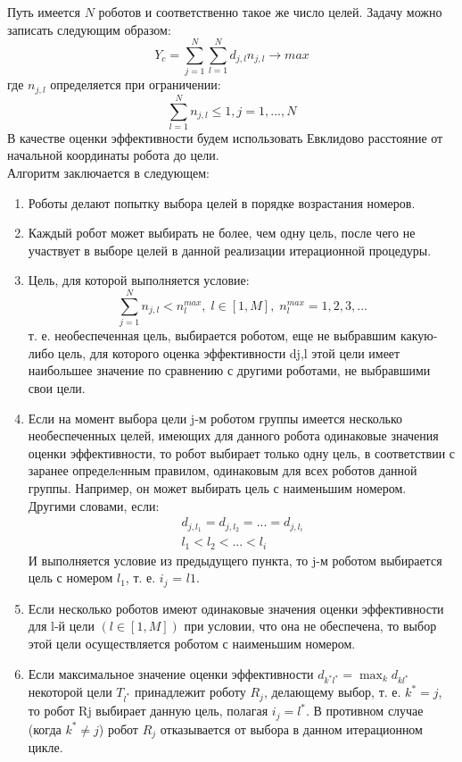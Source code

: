 \documentclass{article}
\numberwithin{equation}{section}
\begin{document}
		Путь имеется $N$ роботов и соответственно такое же число целей.
		Задачу можно записать следующим образом:
		\[
			Y_{c} = \sum_{j = 1}^{N} \sum_{l = 1}^{N} d_{j,l}n_{j,l} \rightarrow max
		\]
		где $n_{j,l}$ определяется при ограничении:
		\[
			\sum_{l=1}^{N} n_{j,l} \leq 1, j = 1, ... , N
		\]
		В качестве оценки эффективности будем использовать Евклидово расстояние от начальной координаты робота до цели.\\
		Алгоритм заключается в следующем:
		\begin{enumerate}
			\item Роботы делают попытку выбора целей в порядке возрастания номеров.
			\item Каждый робот может выбирать не более, чем одну цель, после чего не участвует в выборе целей в данной реализации итерационной процедуры.
			\item Цель, для которой выполняется условие:
				\[
					\sum_{j=1}^{N} n_{j, l} < n_{l}^{max}, \; l \in [1, M], \; n_{l}^{max} = 1, 2, 3, ...
				\]
				т. е. необеспеченная цель, выбирается роботом, еще не выбравшим какую-либо цель, для которого оценка эффективности dj,l этой цели имеет наибольшее значение по сравнению с другими роботами, не выбравшими свои цели.
			\item Если на момент выбора цели j-м роботом группы имеется
			несколько необеспеченных целей, имеющих для данного робота одинаковые значения оценки эффективности, то робот выбирает только одну цель, в соответствии с заранее определeнным правилом, одинаковым для всех роботов данной группы. Например, он может выбирать цель с наименьшим номером. Другими словами, если:
			\begin{gather*}
					d_{j,l_{1}} = d_{j,l_{2}} = ... = d_{j,l_{i}} \\
					l_{1} < l_{2} < ... < l_{i}
			\end{gather*}
			И выполняется условие из предыдущего пункта, то j-м роботом выбирается цель с номером $l_{1}$, т. е. $i_{j}$ = $l{1}$.
			\item Если несколько роботов имеют одинаковые значения оценки эффективности для l-й цели $(l \in [1, M])$ при условии, что она не обеспечена, то выбор этой цели осуществляется роботом с наименьшим номером.
			\item   Если максимальное значение оценки эффективности
			$ d_{k^{*}l^{*}} = \max_{k}d_{kl^{*}}$ некоторой цели $T_{l^{*}}$ принадлежит роботу $R_{j}$, делающему выбор, т. е. $k^{*} = j$, то робот Rj выбирает данную цель, полагая $i_{j} = l^{*}$. В противном случае (когда $k^{*} \neq j$) робот $R_{j}$ отказывается от выбора в данном итерационном цикле.
		\end{enumerate}
\end{document}
